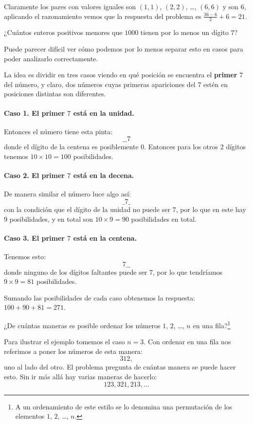 Claramente los pares con valores iguales son
$(1, 1)$, $(2, 2)$, \dots, $(6, 6)$ y son $6$,
aplicando el razonamiento vemos que la respuesta
del problema es $\frac{36 - 6}2 + 6 = 21$.


\begin{example}
	¿Cuántos enteros positivos menores que $1000$
	tienen por lo menos un dígito $7$?
\end{example}

Puede parecer difícil ver cómo podemos
por lo menos separar esto en casos
para poder analizarlo correctamente.

La idea es dividir en tres casos
viendo en qué posición se encuentra
el \textbf{primer} $7$ del número,
y claro, dos números cuyas primeras apariciones del
$7$ estén en posiciones distintas son
diferentes.

\paragraph{Caso 1. El primer $7$ está en la unidad. }
Entonces el número tiene esta pinta:
\[\_\_7\]
donde el dígito de la centena es posiblemente $0$.
Entonces para los otros $2$ dígitos tenemos
$10 \times 10 = 100$ posibilidades.

\paragraph{Caso 2. El primer $7$ está en la decena. }
De manera similar el número luce algo así:
\[\_7\_\]
con la condición que el dígito de la unidad
no puede ser $7$, por lo que en este hay $9$
posibilidades, y en total son $10 \times 9 = 90$
posibilidades en total.

\paragraph{Caso 3. El primer $7$ está en la centena.}
Tenemos esto:
\[7\_\_\]
donde ninguno de los dígitos faltantes
puede ser $7$, por lo que tendríamos $9 \times 9 = 81$
posibilidades.

Sumando las posibilidades de cada caso obtenemos la
respuesta: $100 + 90 + 81 = 271$.

\begin{example}[Factorial]
	¿De cuántas maneras es posible ordenar los
	números $1$, $2$, \dots, $n$ en una fila?\footnote{
		A un ordenamiento de este estilo se lo denomina
		una permutación de los elementos
		$1$, $2$, \dots, $n$.
	}
\end{example}
Para ilustrar el ejemplo tomemos
el caso $n = 3$.
Con ordenar en una fila nos referimos
a poner los números de esta manera:
\[312,\]
uno al lado del otro. El problema
pregunta de cuántas manera se puede hacer esto.
Sin ir más allá hay varias maneras de hacerlo:
\[123, 321, 213, \dots\]


